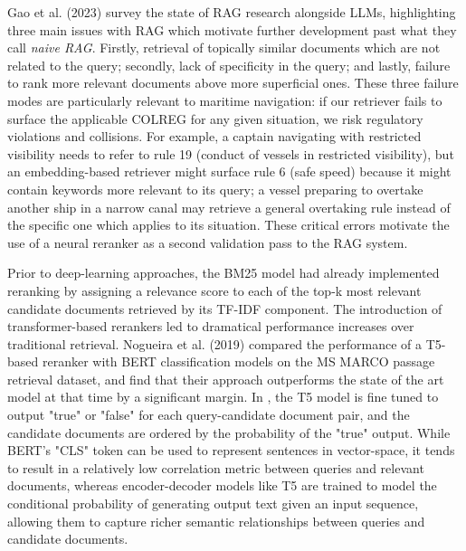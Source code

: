 \documentclass[10pt]{reportMaster}
\begin{document}
Gao et al. (2023) survey the state of RAG research alongside LLMs, highlighting three main issues with RAG which motivate further development past what they call \textit{naive RAG}. Firstly, retrieval of topically similar documents which are not related to the query; secondly, lack of specificity in the query; and lastly, failure to rank more relevant documents above more superficial ones. These three failure modes are particularly relevant to maritime navigation: if our retriever fails to surface the applicable COLREG for any given situation, we risk regulatory violations and collisions. For example, a captain navigating with restricted visibility needs to refer to rule 19 (conduct of vessels in restricted visibility), but an embedding-based retriever might surface rule 6 (safe speed) because it might contain keywords more relevant to its query; a vessel preparing to overtake another ship in a narrow canal may retrieve a general overtaking rule instead of the specific one which applies to its situation. These critical errors motivate the use of a neural reranker as a second validation pass to the RAG system.

Prior to deep-learning approaches, the BM25 model had already implemented reranking by assigning a relevance score to each of the top-k most relevant candidate documents retrieved by its TF-IDF component. The introduction of transformer-based rerankers led to dramatical performance increases over traditional retrieval. Nogueira et al. (2019) compared the performance of a T5-based reranker with BERT classification models on the MS MARCO passage retrieval dataset, and find that their approach outperforms the state of the art model at that time by a significant margin. In \cite{nogueira2020documentrankingpretrainedsequencetosequence}, the T5 model is fine tuned to output "true" or "false" for each query-candidate document pair, and the candidate documents are ordered by the probability of the "true" output. While BERT's "CLS" token can be used to represent sentences in vector-space, it tends to result in a relatively low correlation metric between queries and relevant documents\cite{reimers2019sentencebertsentenceembeddingsusing}, whereas encoder-decoder models like T5 are trained to model the conditional probability of generating output text given an input sequence, allowing them to capture richer semantic relationships between queries and candidate documents.
\end{document}
